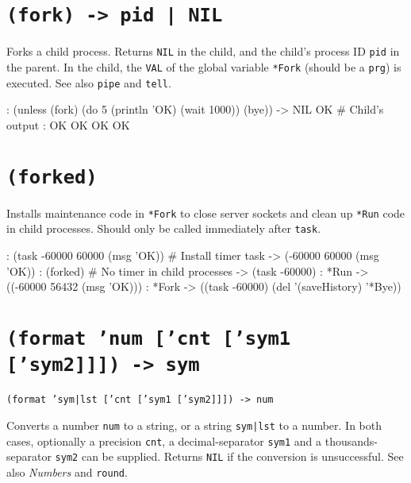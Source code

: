  
\section*{\texttt{(fork) -> pid | NIL}}
\label{sec:func-ref-F-(fork) -> pid | NIL}


Forks a child process. Returns \texttt{NIL} in the child, and the child's
process ID \texttt{pid} in the parent. In the child, the \texttt{VAL} of the global
variable \texttt{*Fork} (should be a \texttt{prg}) is executed. See also \texttt{pipe} and
\texttt{tell}.


\begin{wideverbatim}
: (unless (fork) (do 5 (println 'OK) (wait 1000)) (bye))
-> NIL
OK                                      # Child's output
: OK
OK
OK
OK
\end{wideverbatim}

 
\section*{\texttt{(forked)}}
\label{sec:func-ref-F-(forked)}


Installs maintenance code in \texttt{*Fork} to close server sockets and clean
up \texttt{*Run} code in child processes. Should only be called immediately
after \texttt{task}.


\begin{wideverbatim}
: (task -60000 60000 (msg 'OK))     # Install timer task
-> (-60000 60000 (msg 'OK))
: (forked)                          # No timer in child processes
-> (task -60000)
: *Run
-> ((-60000 56432 (msg 'OK)))
: *Fork
-> ((task -60000) (del '(saveHistory) '*Bye))
\end{wideverbatim}

 
\section*{\texttt{(format 'num ['cnt ['sym1 ['sym2]]]) -> sym}}
\label{sec:func-ref-F-(format 'num ['cnt ['sym1 ['sym2]]]) -> sym}


\texttt{(format 'sym|lst ['cnt ['sym1 ['sym2]]]) -> num}

Converts a number \texttt{num} to a string, or a string \texttt{sym|lst} to a number.
In both cases, optionally a precision \texttt{cnt}, a decimal-separator \texttt{sym1}
and a thousands-separator \texttt{sym2} can be supplied. Returns \texttt{NIL} if the
conversion is unsuccessful. See also \emph{Numbers} and
\texttt{round}.


